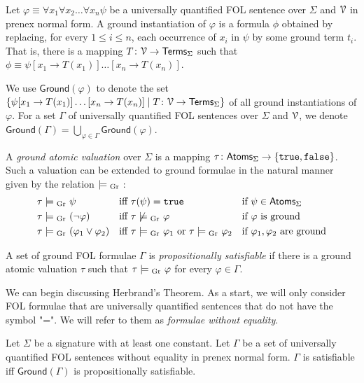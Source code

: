 \documentclass[11pt,usenames, dvipsnames]{article}
\begin{document}
\begin{definition}
  Let $\varphi \equiv \forall x_1 \forall x_2 \ldots \forall x_n \psi$ be a universally quantified FOL sentence over $\Sigma$ and $\vars$ in prenex normal form. A ground instantiation of $\varphi$ is a formula $\phi$ obtained by replacing, for every $1 \le i \le n$, each occurrence of $x_i$ in $\psi$ by some ground term $t_i$. That is, there is a mapping $T \colon \vars \to \terms_{\Sigma}$ such that $\phi \equiv \psi[x_1 \to T(x_1)]\ldots[x_n \to T(x_n)]$.
  
  We use $\mathsf{Ground}(\varphi)$ to denote the set $\{\psi[x_1 \to T(x_1)]\ldots[x_n \to T(x_n)] \mid T \colon \vars \to \terms_{\Sigma}\}$ of all ground instantiations of $\varphi$. For a set $\Gamma$ of universally quantified FOL sentences over $\Sigma$ and $\vars$, we denote $\mathsf{Ground}(\Gamma) = \bigcup\limits_{\varphi \in \Gamma}\mathsf{Ground}(\varphi)$.
\end{definition}

\begin{definition}
  A \emph{ground atomic valuation} over $\Sigma$ is a mapping $\tau \colon \mathsf{Atoms}_{\Sigma} \to \{ \texttt{true}, \texttt{false} \}$. Such a valuation can be extended to ground formulae in the natural manner given by the relation $\models\textsubscript{Gr}\ $:
  \begin{align*}
    \tau &\models\textsubscript{Gr}\  \psi &&\text{iff $\tau(\psi) = \texttt{true}$} &&\text{if } \psi \in \mathsf{Atoms}_{\Sigma} \\
    \tau &\models\textsubscript{Gr}\  (\neg \varphi) &&\text{iff $\tau \not\models\textsubscript{Gr}\  \varphi$} && \text{if $\varphi$ is ground} \\
    \tau &\models\textsubscript{Gr}\  (\varphi_1 \lor \varphi_2) &&\text{iff $\tau \models\textsubscript{Gr}\  \varphi_1$ or $\tau \models\textsubscript{Gr}\  \varphi_2$} && \text{if $\varphi_1, \varphi_2$ are ground}
  \end{align*}

  A set of ground FOL formulae $\Gamma$ is \emph{propositionally satisfiable} if there is a ground atomic valuation $\tau$ such that $\tau \models\textsubscript{Gr}\  \varphi$ for every $\varphi \in \Gamma$.
\end{definition}

We can begin discussing Herbrand's Theorem. As a start, we will only consider FOL formulae that are universally quantified sentences that do not have the symbol "=". We will refer to them as \emph{formulae without equality}.

\begin{theorem}
  Let $\Sigma$ be a signature with at least one constant. Let $\Gamma$ be a set of universally quantified FOL sentences without equality in prenex normal form. $\Gamma$ is satisfiable iff $\mathsf{Ground}(\Gamma)$ is propositionally satisfiable.
\end{theorem}
\end{document}
